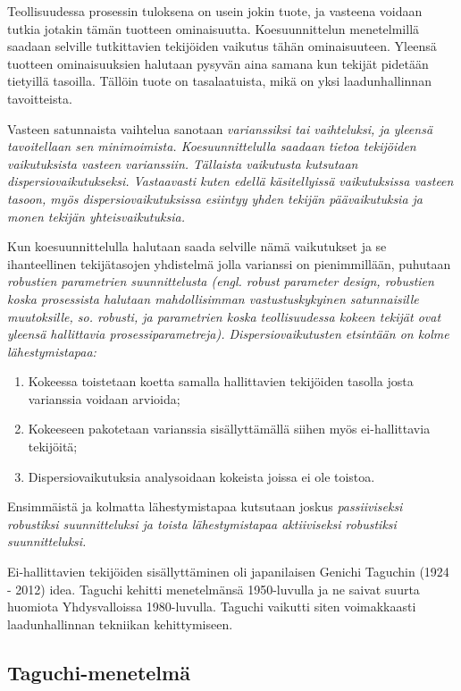 \documentclass[12pt,a4paper,finnish]{tutthesis}
\begin{document}
Teollisuudessa prosessin tuloksena on usein jokin tuote, ja vasteena voidaan
tutkia jotakin tämän tuotteen ominaisuutta. Koesuunnittelun menetelmillä
saadaan selville tutkittavien tekijöiden vaikutus tähän ominaisuuteen.
Yleensä tuotteen ominaisuuksien halutaan pysyvän aina samana kun
tekijät pidetään tietyillä tasoilla. Tällöin tuote on tasalaatuista, mikä
on yksi laadunhallinnan tavoitteista.

Vasteen satunnaista vaihtelua sanotaan \em varianssiksi \em tai \em vaihteluksi, \em
ja yleensä tavoitellaan sen minimoimista. Koesuunnittelulla saadaan
tietoa tekijöiden vaikutuksista vasteen varianssiin. Tällaista vaikutusta
kutsutaan \em dispersiovaikutukseksi. \em
Vastaavasti kuten edellä käsitellyissä vaikutuksissa vasteen tasoon,
myös dispersiovaikutuksissa esiintyy yhden tekijän päävaikutuksia
ja monen tekijän yhteisvaikutuksia.


Kun koesuunnittelulla halutaan saada selville nämä vaikutukset
ja se ihanteellinen tekijätasojen yhdistelmä jolla varianssi on pienimmillään,
puhutaan \em robustien parametrien suunnittelusta \em (engl. \em robust
parameter design\em, robustien koska prosessista halutaan mahdollisimman
vastustuskykyinen satunnaisille muutoksille, so. robusti, ja parametrien koska
teollisuudessa kokeen tekijät ovat yleensä hallittavia prosessiparametreja).
Dispersiovaikutusten etsintään on kolme lähestymistapaa:

\begin{enumerate}
\item  Kokeessa toistetaan koetta samalla hallittavien tekijöiden
    tasolla josta varianssia voidaan arvioida;
\item Kokeeseen pakotetaan varianssia sisällyttämällä siihen
    myös ei-hallittavia tekijöitä;
\item Dispersiovaikutuksia analysoidaan kokeista joissa ei
    ole toistoa. \parencite{Bursztyn}
\end{enumerate}

Ensimmäistä ja kolmatta lähestymistapaa kutsutaan joskus
\em passiiviseksi \em robustiksi suunnitteluksi ja toista lähestymistapaa
\em aktiiviseksi \em robustiksi suunnitteluksi.

Ei-hallittavien tekijöiden sisällyttäminen oli japanilaisen
Genichi Taguchin (1924 - 2012) idea. Taguchi kehitti menetelmänsä
1950-luvulla ja ne saivat suurta huomiota Yhdysvalloissa 1980-luvulla.
Taguchi vaikutti siten voimakkaasti laadunhallinnan tekniikan kehittymiseen.

\subsection{Taguchi-menetelmä}
\end{document}
